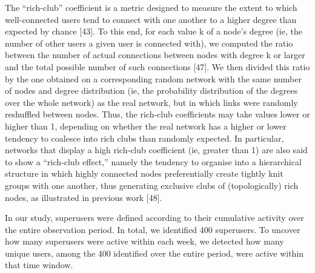 The “rich-club” coefficient is a metric designed to measure the extent to which well-connected users tend to connect with one another to a higher degree than expected by chance [43]. To this end, for each value k of a node’s degree (ie, the number of other users a given user is connected with), we computed the ratio between the number of actual connections between nodes with degree k or larger and the total possible number of such connections [47]. We then divided this ratio by the one obtained on a corresponding random network with the same number of nodes and degree distribution (ie, the probability distribution of the degrees over the whole network) as the real network, but in which links were randomly reshuffled between nodes. Thus, the rich-club coefficients may take values lower or higher than 1, depending on whether the real network has a higher or lower tendency to coalesce into rich clubs than randomly expected. In particular, networks that display a high rich-club coefficient (ie, greater than 1) are also said to show a “rich-club effect,” namely the tendency to organise into a hierarchical structure in which highly connected nodes preferentially create tightly knit groups with one another, thus generating exclusive clubs of (topologically) rich nodes, as illustrated in previous work [48].

In our study, superusers were defined according to their cumulative activity over the entire observation period. In total, we identified 400 superusers. To uncover how many superusers were active within each week, we detected how many unique users, among the 400 identified over the entire period, were active within that time window.

